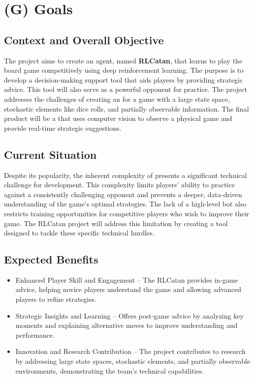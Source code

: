 \documentclass{article}
\begin{document}
\section*{(G) Goals}\label{sec:srs-goals}
\renewcommand{\thesubsection}{G.\arabic{subsection}}

\subsection{Context and Overall Objective}\label{subsec:context-and-overall-objective}
The project aims to create an \AI{} agent, named \textbf{RLCatan}, that learns to play the board game \emph{\Catan{}} competitively using deep reinforcement learning. The purpose is to develop a decision-making support tool that aids players by providing strategic advice. This tool will also serve as a powerful \AI{} opponent for practice. The project addresses the challenges of creating an \AI{} for a game with a large state space, stochastic elements like dice rolls, and partially observable information. The final product will be a \DigitalTwin{} that uses computer vision to observe a physical game and provide real-time strategic suggestions.

\subsection{Current Situation}\label{subsec:current-situation}
Despite its popularity, the inherent complexity of \emph{\Catan{}} presents a significant technical challenge for \AI{} development. This complexity limits players' ability to practice against a consistently challenging opponent and prevents a deeper, data-driven understanding of the game's optimal strategies. The lack of a high-level \AI{} bot also restricts training opportunities for competitive players who wish to improve their game. The RLCatan project will address this limitation by creating a tool designed to tackle these specific technical hurdles.

\subsection{Expected Benefits}\label{subsec:expected-benefits}
\begin{itemize}
    \item {Enhanced Player Skill and Engagement} – The RLCatan \AI{} provides in-game advice, helping novice players understand the game and allowing advanced players to refine strategies.
    \item {Strategic Insights and Learning} – Offers post-game advice by analyzing key moments and explaining alternative moves to improve understanding and performance.
    \item {\AI{} Innovation and Research Contribution} – The project contributes to \AI{} research by addressing large state spaces, stochastic elements, and partially observable environments, demonstrating the team's technical capabilities.
\end{itemize}
\end{document}
